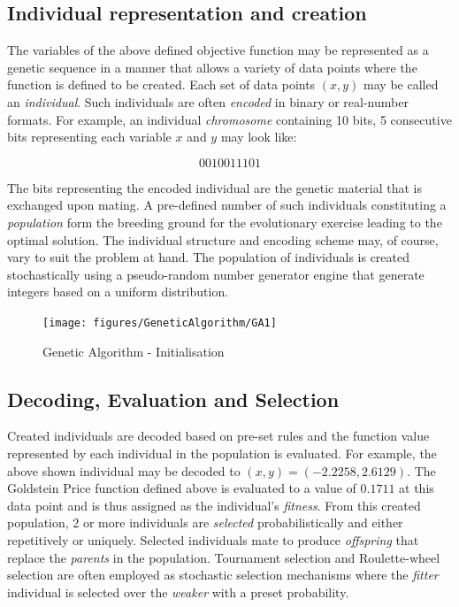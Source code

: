 \documentclass[ExampleMasters.tex]{subfiles}
\begin{document}
		\subsection{Individual representation and creation}
			The variables of the above defined objective function may be represented as a genetic sequence in a manner that allows a variety of data points where the function is defined to be created. Each set of data points $(x,y)$ may be called an \textit{individual}. Such individuals are often \textit{encoded} in binary or real-number formats. For example, an individual \textit{chromosome} containing 10 bits, 5 consecutive bits representing each variable $x$ and $y$ may look like:

			$$ 0     0     1     0     0     1     1     1     0     1$$

			The bits representing the encoded individual are the genetic material that is exchanged upon mating. A pre-defined number of such individuals constituting a \textit{population} form the breeding ground for the evolutionary exercise leading to the optimal solution. The individual structure and encoding scheme may, of course, vary to suit the problem at hand. The population of individuals is created stochastically using a pseudo-random number generator engine that generate integers based on a uniform distribution.\\

			\begin{figure}[H]
				\centering
				\texttt{[image: figures/GeneticAlgorithm/GA1]}
				\caption{Genetic Algorithm - Initialisation}
				\label{GA1}
			\end{figure}

		\subsection{Decoding, Evaluation and Selection}
			Created individuals are decoded based on pre-set rules and the function value represented by each individual in the population is evaluated. For example, the above shown individual may be decoded to $(x,y) = (-2.2258, 2.6129)$. The Goldstein Price function defined above is evaluated to a value of $0.1711$ at this data point and is thus assigned as the individual's \textit{fitness}. From this created population, 2 or more individuals are \textit{selected} probabilistically and either repetitively or uniquely. Selected individuals mate to produce \textit{offspring} that replace the \textit{parents} in the population. Tournament selection and Roulette-wheel selection are often employed as stochastic selection mechanisms where the \textit{fitter} individual is selected over the \textit{weaker} with a preset probability.\\
\end{document}
